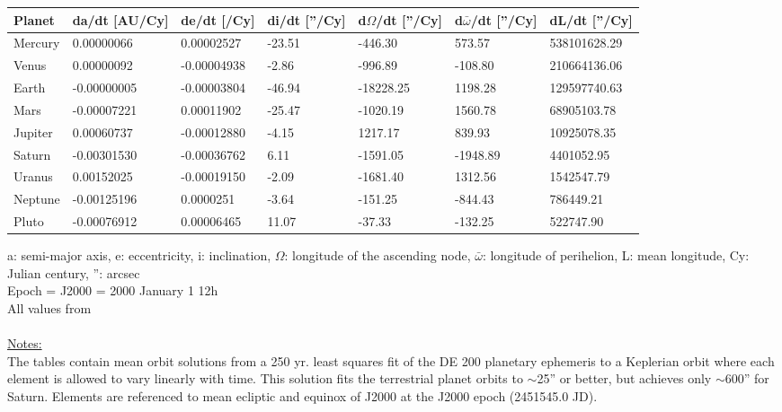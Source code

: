 \documentclass[Orbiter User Manual.tex]{subfiles}
\begin{document}
	\begin{longtable}{ |p{}|p{}|p{}|p{}|p{}|p{}|p{}| }
	\hline\rule{0pt}{2ex}
	\textbf{Planet} & \textbf{da/dt [AU/Cy]} & \textbf{de/dt [/Cy]} & \textbf{di/dt [''/Cy]} & \textbf{d$\Omega$/dt [''/Cy]} & \textbf{d$\bar{\omega}$/dt [''/Cy]} & \textbf{dL/dt [''/Cy]}\\
	\hline\rule{0pt}{2ex}
	Mercury & 0.00000066 & 0.00002527 & -23.51 & -446.30 & 573.57 & 538101628.29\\
	\hline\rule{0pt}{2ex}
	Venus & 0.00000092 & -0.00004938 & -2.86 & -996.89 & -108.80 & 210664136.06\\
	\hline\rule{0pt}{2ex}
	Earth & -0.00000005 & -0.00003804 & -46.94 & -18228.25 & 1198.28 & 129597740.63\\
	\hline\rule{0pt}{2ex}
	Mars & -0.00007221 & 0.00011902 & -25.47 & -1020.19 & 1560.78 & 68905103.78\\
	\hline\rule{0pt}{2ex}
	Jupiter & 0.00060737 & -0.00012880 & -4.15 & 1217.17 & 839.93 & 10925078.35 \\
	\hline\rule{0pt}{2ex}
	Saturn & -0.00301530 & -0.00036762 & 6.11 & -1591.05 & -1948.89 & 4401052.95\\
	\hline\rule{0pt}{2ex}
	Uranus & 0.00152025 & -0.00019150 & -2.09 & -1681.40 & 1312.56 & 1542547.79\\
	\hline\rule{0pt}{2ex}
	Neptune & -0.00125196 & 0.0000251 & -3.64 & -151.25 & -844.43 & 786449.21\\
	\hline\rule{0pt}{2ex}
	Pluto & -0.00076912 & 0.00006465 & 11.07 & -37.33 & -132.25 & 522747.90\\
	\hline
	\end{longtable}

\noindent
a: semi-major axis, e: eccentricity, i: inclination, $\Omega$: longitude of the ascending node, $\bar{\omega}$: longitude of perihelion, L: mean longitude, Cy: Julian century, '': arcsec\\
Epoch = J2000 = 2000 January 1 12h\\
All values from \cite{seidelmann1992p316}\\
\\
\underline{Notes:}\\
The tables contain mean orbit solutions from a 250 yr. least squares fit of the DE 200 planetary ephemeris to a Keplerian orbit where each element is allowed to vary linearly with time. This solution fits the terrestrial planet orbits to $\sim$25'' or better, but achieves only $\sim$600'' for Saturn. Elements are referenced to mean ecliptic and equinox of J2000 at the J2000 epoch (2451545.0 JD).
\end{document}
